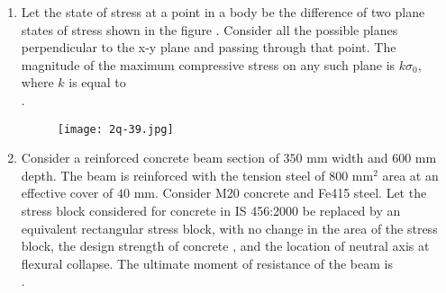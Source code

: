 \documentclass[journal,12pt,onecolumn]{article}
\theoremstyle{remark}
\begin{document}
\begin{enumerate}
    \item Let the state of stress at a point in a body be the difference of two plane states of stress shown in the figure . Consider all the possible planes perpendicular to the x-y plane and passing through that point. The magnitude of the maximum compressive stress on any such plane is $k\sigma_0$, where $k$ is equal to \underline{\hspace{2cm}} \\ .
    \begin{figure}[H]
        \centering
        \texttt{[image: 2q-39.jpg]}
        \caption{}
        \label{fig:q39}
    \end{figure}
    
    \hfill{}
    \begin{enumerate}
    \end{enumerate}

    \item Consider a reinforced concrete beam section of $350$ mm width and $600$ mm depth. The beam is reinforced with the tension steel of $800$ mm$^2$ area at an effective cover of $40$ mm. Consider M20 concrete and Fe415 steel. Let the stress block considered for concrete in IS 456:2000 be replaced by an equivalent rectangular stress block, with no change in  the area of the stress block,  the design strength of concrete , and  the location of neutral axis at flexural collapse. The ultimate moment of resistance of the beam  is \underline{\hspace{2cm}} \\ .

    \hfill{}
    \begin{enumerate}
    \end{enumerate}


\end{enumerate}
\end{document}
